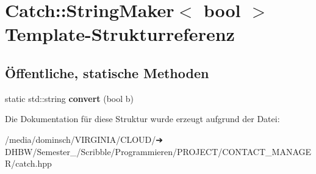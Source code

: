 \hypertarget{structCatch_1_1StringMaker_3_01bool_01_4}{}\section{Catch\+:\+:String\+Maker$<$ bool $>$ Template-\/\+Strukturreferenz}
\label{structCatch_1_1StringMaker_3_01bool_01_4}
\subsection*{Öffentliche, statische Methoden}
\begin{DoxyCompactItemize}
\item 
\mbox{\label{structCatch_1_1StringMaker_3_01bool_01_4_a37e9899c82c4b4515f876f16f8957a77}} 
static std\+::string {\bfseries convert} (bool b)
\end{DoxyCompactItemize}


Die Dokumentation für diese Struktur wurde erzeugt aufgrund der Datei\+:\begin{DoxyCompactItemize}
\item 
/media/dominsch/\+V\+I\+R\+G\+I\+N\+I\+A/\+C\+L\+O\+U\+D/➔ D\+H\+B\+W/\+Semester\+\_/\+Scribble/\+Programmieren/\+P\+R\+O\+J\+E\+C\+T/\+C\+O\+N\+T\+A\+C\+T\+\_\+\+M\+A\+N\+A\+G\+E\+R/catch.\+hpp\end{DoxyCompactItemize}
